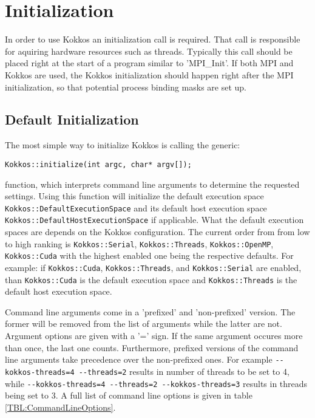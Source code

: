 
\chapter{Initialization}

In order to use Kokkos an initialization call is required. 
That call is responsible for aquiring hardware resources such as threads. 
Typically this call should be placed right at the start of a program similar to 'MPI\_Init'.
If both MPI and Kokkos are used, the Kokkos initialization should happen right after the MPI initialization, 
so that potential process binding masks are set up.

\section{Default Initialization}
The most simple way to initialize Kokkos is calling the generic:

\begin{lstlisting}
Kokkos::initialize(int argc, char* argv[]); 
\end{lstlisting}
function, which interprets command line arguments to determine the requested settings.
Using this function will initialize the default execution space
\lstinline|Kokkos::DefaultExecutionSpace|
 and its default host execution space 
\lstinline|Kokkos::DefaultHostExecutionSpace|
if applicable.
What the default execution spaces are depends on the Kokkos configuration. 
The current order from from low to high ranking is 
\lstinline|Kokkos::Serial|, 
\lstinline|Kokkos::Threads|, 
\lstinline|Kokkos::OpenMP|, 
\lstinline|Kokkos::Cuda| with the highest enabled one being the respective defaults.
For example: if  \lstinline|Kokkos::Cuda|, \lstinline|Kokkos::Threads|, and 
\lstinline|Kokkos::Serial| are enabled, than \lstinline|Kokkos::Cuda| is the
default execution space and \lstinline|Kokkos::Threads| is the default host execution space.

Command line arguments come in a 'prefixed' and 'non-prefixed' version. 
The former will be removed from the list of arguments while the latter are not.
Argument options are given with a '=' sign.
If the same argument occures more than once, the last one counts. 
Furthermore, prefixed versions of the command line arguments take precedence over the non-prefixed ones.
For example \lstinline|--kokkos-threads=4 --threads=2| results in number of threads to be set to 4,
 while \newline\lstinline|--kokkos-threads=4 --threads=2 --kokkos-threads=3| results in threads being set to 3.
A full list of command line options is given in table \ref{TBL:CommandLineOptions}.

